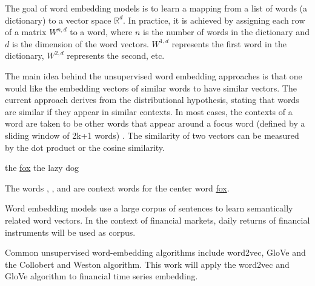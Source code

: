 \documentclass[a4paper, 11pt]{article}
\begin{document}
The goal of word embedding models is to learn a mapping from a list of words (a dictionary) to a vector space \(\mathbb{R}^d\). In practice, it is achieved by assigning each row of a matrix \(W^{n,d}\) to a word, where \(n\) is the number of words in the dictionary and \(d\) is the dimension of the word vectors. \(W^{1,d}\) represents the first word in the dictionary, \(W^{2,d}\) represents the second, etc.

The main idea behind the unsupervised word embedding approaches is that one would like the embedding vectors of similar words to have similar vectors. The current approach derives from the distributional hypothesis, stating that words are similar if they appear in similar contexts. In most cases, the contexts of a word are taken to be other words that appear around a focus word (defined by a sliding window of 2k+1 words) \cite{DBLP:journals/corr/Goldberg15c}. The similarity of two vectors can be measured by the dot product or the cosine similarity.
\begin{center}
the   \underline{fox}   the lazy dog
\end{center}
The words , ,  and  are context words for the center word \underline{fox}.

Word embedding models use a large corpus of sentences to learn semantically related word vectors. In the context of financial markets, daily returns of financial instruments will be used as corpus.

Common unsupervised word-embedding algorithms include word2vec, GloVe and the Collobert and Weston algorithm. This work will apply the word2vec and GloVe algorithm to financial time series embedding. 
\end{document}
